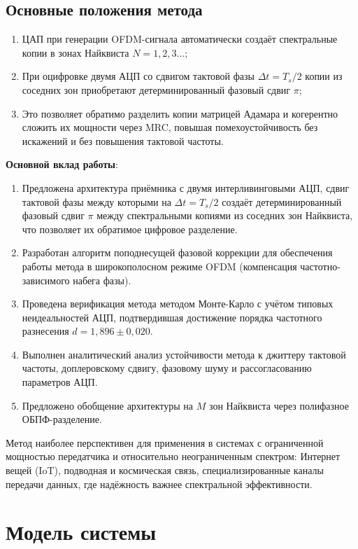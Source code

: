\documentclass[a4paper,12pt]{article}
\numberwithin{equation}{section}
\begin{document}
\subsection*{Основные положения метода}
\begin{enumerate}
    \item ЦАП при генерации OFDM-сигнала автоматически создаёт спектральные копии в зонах Найквиста $N=1,2,3\dots$;
    \item При оцифровке двумя АЦП со сдвигом тактовой фазы $\Delta t = T_s/2$ копии из соседних зон приобретают детерминированный фазовый сдвиг $\pi$;
    \item Это позволяет обратимо разделить копии матрицей Адамара и когерентно сложить их мощности через MRC, повышая помехоустойчивость без искажений и без повышения тактовой частоты.
\end{enumerate}

\textbf{Основной вклад работы}:
\begin{enumerate}
    \item Предложена архитектура приёмника с двумя интерливинговыми АЦП, сдвиг тактовой фазы между которыми на $\Delta t = T_s/2$ создаёт детерминированный фазовый сдвиг $\pi$ между спектральными копиями из соседних зон Найквиста, что позволяет их обратимое цифровое разделение.
    \item Разработан алгоритм поподнесущей фазовой коррекции для обеспечения работы метода в широкополосном режиме OFDM (компенсация частотно-зависимого набега фазы).
    \item Проведена верификация метода методом Монте-Карло с учётом типовых неидеальностей АЦП, подтвердившая достижение порядка частотного разнесения $d = 1{,}896 \pm 0{,}020$.
    \item Выполнен аналитический анализ устойчивости метода к джиттеру тактовой частоты, доплеровскому сдвигу, фазовому шуму и рассогласованию параметров АЦП.
    \item Предложено обобщение архитектуры на $M$ зон Найквиста через полифазное ОБПФ-разделение.
\end{enumerate}

Метод наиболее перспективен для применения в системах с ограниченной мощностью передатчика и относительно неограниченным спектром: Интернет вещей (IoT), подводная и космическая связь, специализированные каналы передачи данных, где надёжность важнее спектральной эффективности.

\section{Модель системы}
\label{sec:model}
\end{document}
